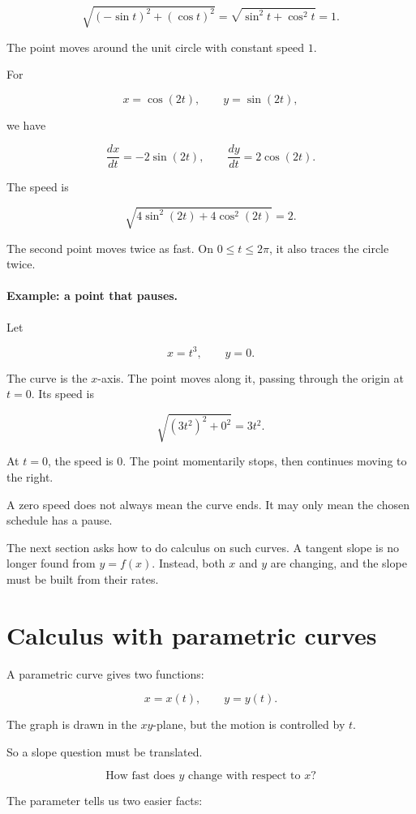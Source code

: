 \[
\sqrt{(-\sin t)^2+(\cos t)^2}
=
\sqrt{\sin^2 t+\cos^2 t}
=
1.
\]

The point moves around the unit circle with constant speed \(1\).

For

\[
x=\cos(2t),
\qquad
y=\sin(2t),
\]

we have

\[
\frac{dx}{dt}=-2\sin(2t),
\qquad
\frac{dy}{dt}=2\cos(2t).
\]

The speed is

\[
\sqrt{4\sin^2(2t)+4\cos^2(2t)}
=
2.
\]

The second point moves twice as fast.  On \(0\le t\le2\pi\), it also traces the circle
twice.

\paragraph{Example: a point that pauses.}
Let

\[
x=t^3,
\qquad
y=0.
\]

The curve is the \(x\)-axis.  The point moves along it, passing through the origin at
\(t=0\).  Its speed is

\[
\sqrt{(3t^2)^2+0^2}=3t^2.
\]

At \(t=0\), the speed is \(0\).  The point momentarily stops, then continues moving to
the right.

A zero speed does not always mean the curve ends.  It may only mean the chosen
schedule has a pause.

The next section asks how to do calculus on such curves.  A tangent slope is no longer
found from \(y=f(x)\).  Instead, both \(x\) and \(y\) are changing, and the slope must be
built from their rates.

\section{Calculus with parametric curves}
\label{sec:calculus-parametric-curves}

A parametric curve gives two functions:

\[
x=x(t),
\qquad
y=y(t).
\]

The graph is drawn in the \(xy\)-plane, but the motion is controlled by \(t\).

So a slope question must be translated.

\[
\text{How fast does \(y\) change with respect to \(x\)?}
\]

The parameter tells us two easier facts:

